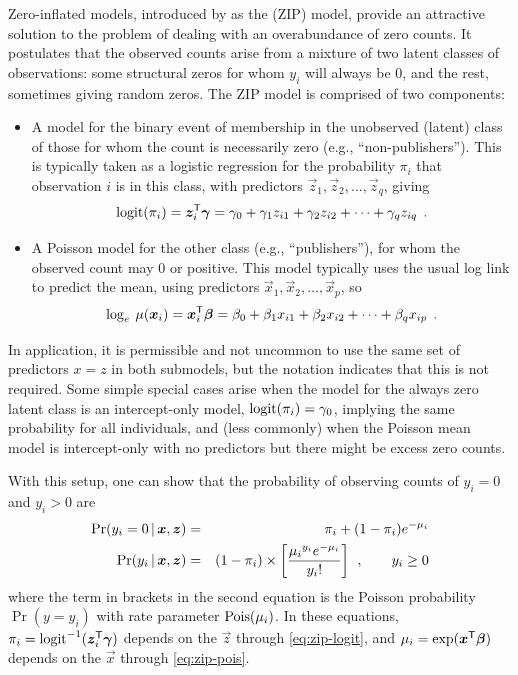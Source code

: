 \documentclass[11pt]{book}\usepackage[]{graphicx}\usepackage[]{color}
\begin{document}
Zero-inflated models, introduced by \citet{Lambert:1992} as the 
(ZIP) model, provide an attractive solution to the problem of dealing with an overabundance of
zero counts.  It postulates that the observed counts arise from a mixture of two latent classes
of observations: some structural zeros for whom $y_i$ will always be 0, and the rest, sometimes
giving random zeros.
The ZIP model is comprised of two components:
\begin{itemize}
  \item A model for the binary event of membership in the unobserved (latent) class of
  those for whom the count is necessarily zero (e.g., ``non-publishers'').  
  This is typically taken as a logistic regression for the probability $\pi_i$ that
  observation $i$ is in this class, with predictors $\vec{z}_1, \vec{z}_2, \dots, \vec{z}_q$, giving
\begin{equation}\label{eq:zip-logit}
 \logit (\pi_i) = \vec{z}_i\trans \vec{\gamma}
                = \gamma_0 + \gamma_1 z_{i1} + \gamma_2 z_{i2} + \cdots + \gamma_q z_{iq} \period
\end{equation}

  \item A Poisson model for the other class (e.g., ``publishers''), for whom the observed count may 0 or
  positive. This model typically uses the usual log link to predict the mean, using predictors
  $\vec{x}_1, \vec{x}_2, \dots, \vec{x}_p$, so
\begin{equation}\label{eq:zip-pois}
  \log_e  \: \mu (\bm{x}_i) = \bm{x}_i ^\mathsf{T} \bm{\beta}
                 = \beta_0 + \beta_1 x_{i1} + \beta_2 x_{i2} + \cdots + \beta_q x_{ip} \:\: .
\end{equation}
\end{itemize}
In application, it is permissible and not uncommon to use the same set of predictors
$x = z$ in both submodels, but the notation indicates that this is not required.
Some simple special cases arise when the model for the always zero latent class
is an intercept-only model, $\logit (\pi_i) = \gamma_0$, implying the same probability
for all individuals, and (less commonly) when the Poisson mean model is intercept-only
with no predictors but there might be excess zero counts.

With this setup, one can show that the probability of observing counts of $y_i = 0$
and $y_i > 0$ are
\begin{eqnarray}
\Pr ({y_i} = 0 \, | \, \bm{x}, \bm{z}) &=& {\pi _i} + (1 - {\pi _i}){e^{ - {\mu _i}}} \label{eq:zip-probs} \\
\Pr ({y_i} \, | \, \bm{x}, \bm{z}) &=& (1 - {\pi _i}) \times \left[\frac{{{\mu _i}^{{y_i}}{e^{ - {\mu _i}}}}}{{{y_i}!}} \right] \:\: , \quad\quad y_i \ge 0 \nonumber
\end{eqnarray}
where the term in brackets in the second equation is the Poisson probability $\Pr(y=y_i)$
with rate parameter $\Pois(\mu_i)$. In these equations, 
$\pi_i= \logit^{-1} (\vec{z}_i\trans \vec{\gamma}) $ depends on the $\vec{z}$ through \eqref{eq:zip-logit}, and 
$\mu_i = \exp(\bm{x}^\mathsf{T}\bm{\beta})$ depends on the $\vec{x}$
through \eqref{eq:zip-pois}.
\end{document}
